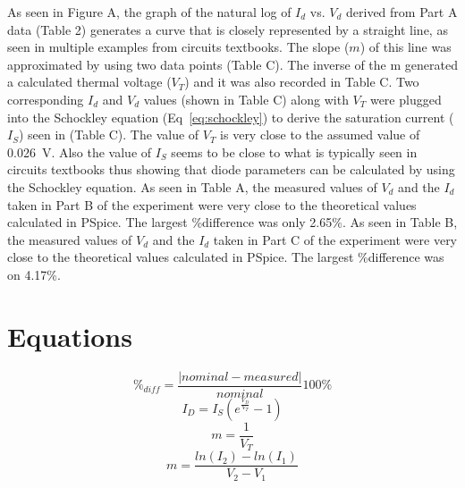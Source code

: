 \documentclass{article}
\begin{document}
As seen in Figure A, the graph of the natural log of $I_d$ vs. $V_d$
derived from Part A data (Table 2) generates a curve that is closely
represented by a straight line, as seen in multiple examples from
circuits textbooks.  The slope ($m$) of this line was approximated by
using two data points (Table C).  The inverse of the m generated a
calculated thermal voltage ($V_T$) and it was also recorded in Table
C.  Two corresponding $I_d$ and $V_d$ values (shown in Table C) along
with $V_T$ were plugged into the Schockley equation
(Eq~\ref{eq:schockley}) to derive the saturation current ($I_S$) seen
in (Table C).  The value of $V_T$ is very close to the assumed value
of \SI{0.026}{V}.  Also the value of $I_S$ seems to be close to what
is typically seen in circuits textbooks thus showing that diode
parameters can be calculated by using the Schockley equation.  As seen
in Table A, the measured values of $V_d$ and the $I_d$ taken in Part B
of the experiment were very close to the theoretical values calculated
in PSpice. The largest \%difference was only 2.65\%.  As seen in Table
B, the measured values of $V_d$ and the $I_d$ taken in Part C of the
experiment were very close to the theoretical values calculated in
PSpice. The largest \%difference was on 4.17\%.

\section{Equations}
\label{sec:equations}

\begin{equation}
  \label{eq:percent_diff}
  \%_{diff} = \frac{|nominal - measured|}{nominal}100\%
\end{equation}
%
\begin{equation}
  \label{eq:schockley}
  I_D = I_S \left(e^{\frac{V_D}{V_T}} - 1\right)
\end{equation}
%
\begin{equation}
  \label{eq:m_nom}
  m = \frac{1}{V_T}
\end{equation}
%
\begin{equation}
  \label{eq:m_meas}
  m = \frac{ln(I_2)-ln(I_1)}{V_2-V_1}
\end{equation}
\end{document}
